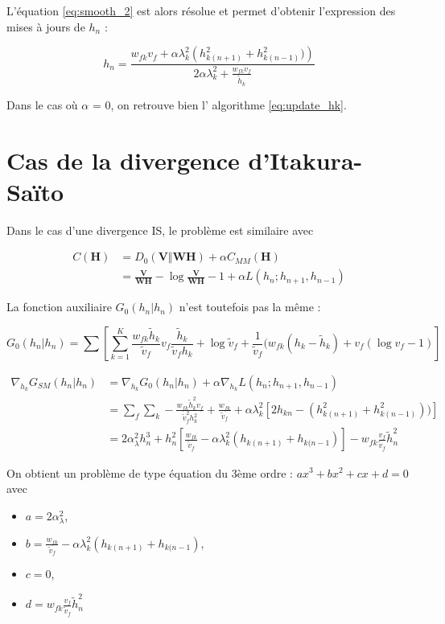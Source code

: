 L'équation \ref{eq:smooth_2} est alors résolue et permet d'obtenir l'expression des mises à jours de $h_n$ : 

\begin{equation}
h_n = \frac{w_{fk} v_f+\alpha   \lambda_k^2 \left(h_{k(n+1)}^2+h_{k(n-1)}^2)\right)}{2\alpha \lambda_k^2 + \frac{w_{fk} v_f} {\tilde{h}_k}}
\end{equation}

Dans le cas où $\alpha$ = 0, on retrouve bien l' algorithme \ref{eq:update_hk}.


\section{Cas de la divergence d'Itakura-Saïto}
Dans le cas d'une divergence IS, le problème est similaire avec

\begin{align}
C(\mathbf{H}) &= D_0(\mathbf{V} \Vert \mathbf{WH}) + \alpha C_{MM}(\mathbf{H})\\
 &= \frac{\mathbf{V}}{\mathbf{WH}}-\log \frac{\mathbf{V}}{\mathbf{WH}}-1+\alpha L(h_n; h_{n+1}, h_{n-1}) 
\end{align}

La fonction auxiliaire $G_0(h_n\vert h_n)$ n'est toutefois pas la même : 

\begin{equation}
G_0(h_n\vert h_n) = \sum \left[ \sum_{k = 1}^K \frac{w_{fk} \tilde{h}_k}{\tilde{v}_f}v_f \frac{\tilde{h}_k}{\tilde{v}_f h_k} + \log \tilde{v}_f+ \frac{1}{\tilde{v}_f}(w_{fk}(h_k-\tilde{h}_k) + v_f(\log v_f - 1)\right]
\end{equation}

\begin{align}
\nabla_{h_k} G_{SM}(h_n\vert h_n) &= \nabla_{h_k} G_0(h_n\vert h_n) + \alpha \nabla_{h_k} L(h_n; h_{n+1}, h_{n-1})\\
&= \sum_f \sum_k -\frac{w_{fk} \tilde{h}_k^2 v_f}{\tilde{v}_f^2 h_k^2}+\frac{w_{fk}}{\tilde{v}_f} + \alpha \lambda_k^2 \left[ 2 h_{kn} - (h_{k(n+1)}^2+h_{k(n-1)}^2)) \right]\\
 &= 2\alpha_\lambda^2h_n^3+h_{n}^2\left[\frac{w_{fk}}{\tilde{v}_f} - \alpha \lambda_k^2(h_{k(n+1)}+h_{k(n-1}) \right] - w_{fk}\frac{v_f}{\tilde{v}_f}\tilde{h}_n^2 \label{eq:eq_mimiser_smooth}
\end{align}

On obtient un problème de type équation du 3ème ordre : $ax^3+bx^2+cx+d = 0$ avec 
\begin{itemize}
\item $a = 2\alpha_\lambda^2$, 
\item $b = \frac{w_{fk}}{\tilde{v}_f} - \alpha \lambda_k^2(h_{k(n+1)}+h_{k(n-1})$, 
\item $c = 0$, 
\item $d = w_{fk}\frac{v_f}{\tilde{v}_f}\tilde{h}_n^2$
\end{itemize}

